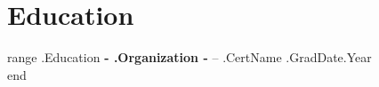 \documentclass[10pt,letterpaper]{article}
\begin{document}




\section*{Education}
{{range .Education}}
\textbf{ {{- .Organization -}} } -- {{.CertName}} \hfill {{.GradDate.Year}} \\
{{end}}
\end{document}
